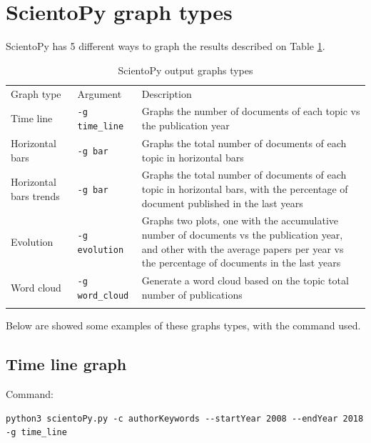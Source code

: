 \documentclass[10pt,letterpaper]{article}
\begin{document}
\newpage
\section{ScientoPy graph types}

ScientoPy has 5 different ways to graph the results described on Table \ref{table_graph_types}.

\begin{table}[!h]
	\centering
	\caption{ScientoPy output graphs types}
	\label{table_graph_types}

	\renewcommand{\arraystretch}{1.5}
	\begin{tabular}{ p{4cm} p{3cm} p{10cm}}
	\hline\noalign{\smallskip}
	Graph type     &  Argument & Description                             \\
	\noalign{\smallskip}\hline\noalign{\smallskip}                                                                         
	Time line      & \verb|-g time_line| & Graphs the number of documents of each topic vs the publication year \\
	Horizontal bars  & \verb|-g bar| & Graphs the total number of documents of each topic in horizontal bars \\
	Horizontal bars trends  & \verb|-g bar| & Graphs the total number of documents of each topic in horizontal bars, with the percentage of document published in the last years \\
	Evolution     & \verb|-g evolution| & Graphs two plots, one with the accumulative number of documents vs the publication year, and other with the average papers per year vs the percentage of documents in the last years\\
	Word cloud     & \verb|-g word_cloud| & Generate a word cloud based on the topic total number of publications \\
	\noalign{\smallskip}\hline
	\end{tabular}
\end{table}

Below are showed some examples of these graphs types, with the command used.

\subsection{Time line graph}
Command: 
\begin{verbatim}
python3 scientoPy.py -c authorKeywords --startYear 2008 --endYear 2018 -g time_line
\end{verbatim}
\end{document}
